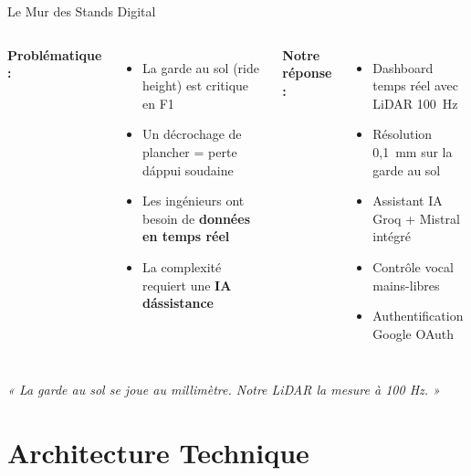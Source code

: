 \documentclass[11pt,aspectratio=169]{beamer}
\begin{document}
\begin{frame}{Le Mur des Stands Digital}
  \begin{columns}
    \textbf{\textcolor{ferrariRed}{Probl\'ematique :}} \\[0.3cm]
    \begin{itemize}
      \item La garde au sol (ride height) est critique en F1
      \item Un d\'ecrochage de plancher = perte d\'appui soudaine
      \item Les ing\'enieurs ont besoin de \textbf{donn\'ees en temps r\'eel}
      \item La complexit\'e requiert une \textbf{IA d\'assistance}
    \end{itemize}

    \textbf{\textcolor{ferrariRed}{Notre r\'eponse :}} \\[0.3cm]
    \begin{itemize}
      \item Dashboard temps r\'eel avec LiDAR 100~Hz
      \item R\'esolution 0,1~mm sur la garde au sol
      \item Assistant IA Groq + Mistral int\'egr\'e
      \item Contr\^ole vocal mains-libres
      \item Authentification Google OAuth
    \end{itemize}
  \end{columns}

  \vspace{0.5cm}
  \begin{center}
    \textcolor{ferrariMuted}{\textit{« La garde au sol se joue au millim\`etre. Notre LiDAR la mesure \`a 100 Hz. »}}
  \end{center}
\end{frame}

\section{Architecture Technique}
\end{document}
